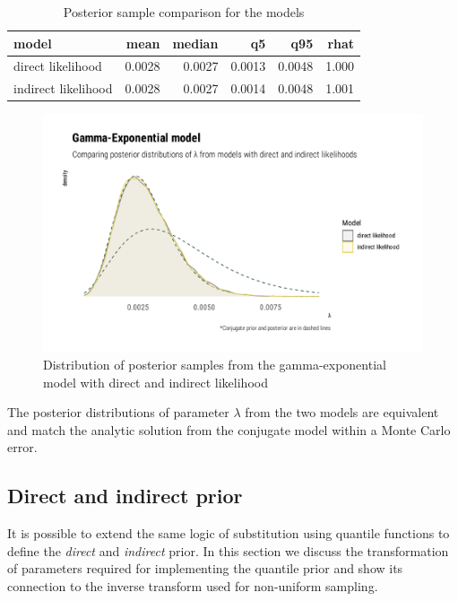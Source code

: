\documentclass[
  12pt,
]{article}
\begin{document}
\begin{table}[!h]

\caption{\label{tab:gexp-likelihood-tab}Posterior sample comparison for the models}
\centering
\begin{tabular}[t]{lrrrrr}
\toprule
model & mean & median & q5 & q95 & rhat\\
\midrule
direct likelihood & 0.0028 & 0.0027 & 0.0013 & 0.0048 & 1.000\\
indirect likelihood & 0.0028 & 0.0027 & 0.0014 & 0.0048 & 1.001\\
\bottomrule
\end{tabular}
\end{table}

\begin{figure}

{\centering \includegraphics[width=0.8\linewidth]{ilbm_article_files/figure-latex/gexp-likelihood-graphs-1} 

}

\caption{Distribution of posterior samples from the gamma-exponential model with direct and indirect likelihood}\label{fig:gexp-likelihood-graphs}
\end{figure}

The posterior distributions of parameter \(\lambda\) from the two models are equivalent and match the analytic solution from the conjugate model within a Monte Carlo error.

\hypertarget{direct-and-indirect-prior}{%
\subsection{Direct and indirect prior}\label{direct-and-indirect-prior}}

It is possible to extend the same logic of substitution using quantile functions to define the \emph{direct} and \emph{indirect} prior. In this section we discuss the transformation of parameters required for implementing the quantile prior and show its connection to the inverse transform used for non-uniform sampling.
\end{document}

